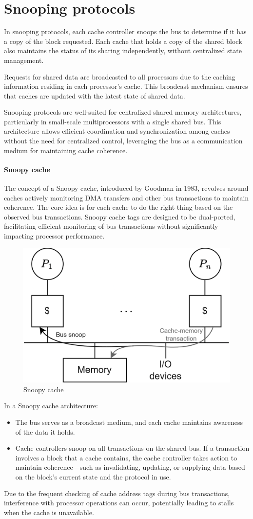 \section{Snooping protocols}

In snooping protocols, each cache controller snoops the bus to determine if it has a copy of the block requested.
Each cache that holds a copy of the shared block also maintains the status of its sharing independently, without centralized state management.

Requests for shared data are broadcasted to all processors due to the caching information residing in each processor's cache. 
This broadcast mechanism ensures that caches are updated with the latest state of shared data.

Snooping protocols are well-suited for centralized shared memory architectures, particularly in small-scale multiprocessors with a single shared bus. 
This architecture allows efficient coordination and synchronization among caches without the need for centralized control, leveraging the bus as a communication medium for maintaining cache coherence.

\paragraph*{Snoopy cache}
The concept of a Snoopy cache, introduced by Goodman in 1983, revolves around caches actively monitoring DMA transfers and other bus transactions to maintain coherence. 
The core idea is for each cache to do the right thing based on the observed bus transactions.
Snoopy cache tags are designed to be dual-ported, facilitating efficient monitoring of bus transactions without significantly impacting processor performance.
\begin{figure}[H]
    \centering
    \includegraphics[width=0.5\linewidth]{images/snop.png}
    \caption{Snoopy cache}
\end{figure}
In a Snoopy cache architecture:
\begin{itemize}
    \item The bus serves as a broadcast medium, and each cache maintains awareness of the data it holds.
    \item Cache controllers snoop on all transactions on the shared bus. 
        If a transaction involves a block that a cache contains, the cache controller takes action to maintain coherence—such as invalidating, updating, or supplying data based on the block's current state and the protocol in use.
\end{itemize}
Due to the frequent checking of cache address tags during bus transactions, interference with processor operations can occur, potentially leading to stalls when the cache is unavailable.

